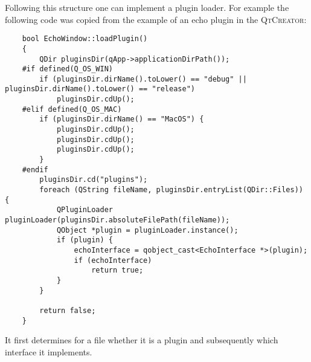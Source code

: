 \documentclass[a4paper,11pt,final]{article}
\newcommand{\code}[1]{\textsc{#1}\xspace}%
\begin{document}
Following this structure one can implement a plugin loader. For example the following code was 
copied from the example of an echo plugin in the \code{QtCreator}:

\begin{verbatim}
	bool EchoWindow::loadPlugin()
	{
	    QDir pluginsDir(qApp->applicationDirPath());
	#if defined(Q_OS_WIN)
	    if (pluginsDir.dirName().toLower() == "debug" || pluginsDir.dirName().toLower() == "release")
	        pluginsDir.cdUp();
	#elif defined(Q_OS_MAC)
	    if (pluginsDir.dirName() == "MacOS") {
	        pluginsDir.cdUp();
	        pluginsDir.cdUp();
	        pluginsDir.cdUp();
	    }
	#endif
	    pluginsDir.cd("plugins");
	    foreach (QString fileName, pluginsDir.entryList(QDir::Files)) {
	        QPluginLoader pluginLoader(pluginsDir.absoluteFilePath(fileName));
	        QObject *plugin = pluginLoader.instance();
	        if (plugin) {
	            echoInterface = qobject_cast<EchoInterface *>(plugin);
	            if (echoInterface)
	                return true;
	        }
	    }
	
	    return false;
	}
\end{verbatim}

It first determines for a file whether it is a plugin and subsequently which interface
it implements.
\end{document}
